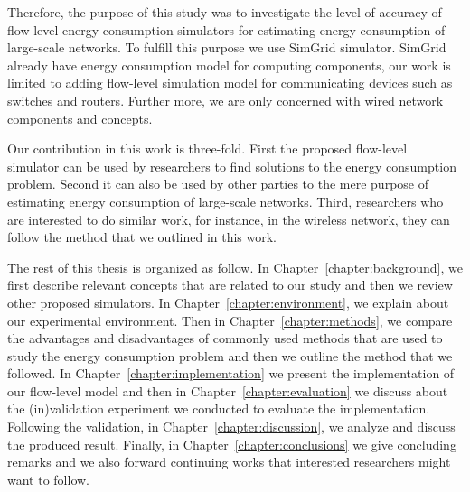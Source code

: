 Therefore, the purpose of this study was to investigate the level of accuracy of flow-level energy consumption simulators for estimating energy consumption of large-scale networks. To fulfill this purpose we use SimGrid simulator. SimGrid already have energy consumption model for computing components, our work is limited to adding flow-level simulation model for communicating devices such as switches and routers. Further more, we are only concerned with wired network components and concepts. 

Our contribution in this work is three-fold. First the proposed flow-level simulator can be used by researchers to find solutions to the energy consumption problem. Second it can also be used by other parties to the mere purpose of estimating energy consumption of large-scale networks. Third, researchers who are interested to do similar work, for instance, in the wireless network, they can follow the method that we outlined in this work.  

The rest of this thesis is organized as follow. In Chapter~\ref{chapter:background}, we first describe relevant concepts that are related to our study and then we review other proposed simulators. In Chapter~\ref{chapter:environment}, we explain about our experimental environment. Then in Chapter~\ref{chapter:methods}, we compare the advantages and disadvantages of commonly used methods that are used to study the energy consumption problem and then we outline the method that we followed. In Chapter~\ref{chapter:implementation} we present the implementation of our flow-level model and then in Chapter~\ref{chapter:evaluation} we discuss about the (in)validation experiment we conducted to evaluate the implementation. Following the validation, in Chapter~\ref{chapter:discussion}, we analyze and discuss the produced result. Finally, in Chapter~\ref{chapter:conclusions} we give concluding remarks and we also forward continuing works that interested researchers might want to follow.


